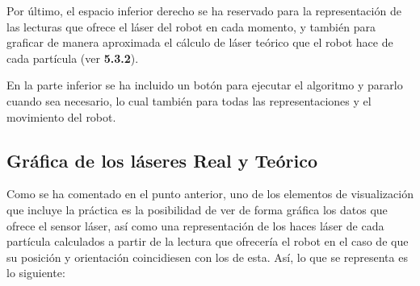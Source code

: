 Por último, el espacio inferior derecho se ha reservado para la representación de las lecturas que ofrece el láser del robot en cada momento, y también para graficar de manera aproximada el cálculo de láser teórico que el robot hace de cada partícula (ver \textbf{5.3.2}).

En la parte inferior se ha incluido un botón para ejecutar el algoritmo y pararlo cuando sea necesario, lo cual también para todas las representaciones y el movimiento del robot. 

\subsection{Gráfica de los láseres Real y Teórico}
Como se ha comentado en el punto anterior, uno de los elementos de visualización que incluye la práctica es la posibilidad de ver de forma gráfica los datos que ofrece el sensor láser, así como una representación de los haces láser de cada partícula calculados a partir de la lectura que ofrecería el robot en el caso de que su posición y orientación coincidiesen con los de esta. Así, lo que se representa es lo siguiente:

